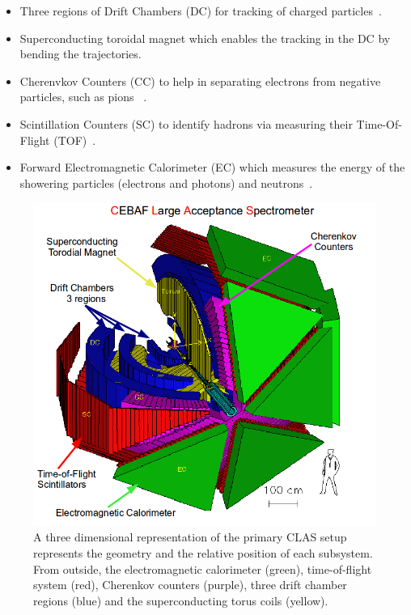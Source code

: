 \documentclass[twocolumn,showpacs,superscriptaddress,groupedaddress]{revtex4}
\begin{document}
\begin{itemize}
 \item Three regions of Drift Chambers (DC) for tracking of charged 
    particles~\cite{DCref}.
 \item Superconducting toroidal magnet which enables the tracking in the DC by 
    bending the trajectories.
 \item Cherenvkov Counters (CC) to help in separating electrons from negative 
    particles, such as pions ~\cite{CCref}.
 \item Scintillation Counters (SC) to identify hadrons via measuring their 
    Time-Of-Flight (TOF)~\cite{TOFref}.
 \item Forward Electromagnetic Calorimeter (EC) which measures the energy of 
    the showering particles (electrons and photons) and neutrons~\cite{ECref}.
\end{itemize}

\begin{figure}[tbp]
\centering \includegraphics[scale=0.3]{fig/test_clas.png}
\caption{A three dimensional representation of the primary CLAS setup 
   represents the geometry and the relative position of each subsystem. From 
   outside, the electromagnetic calorimeter (green), time-of-flight system 
   (red), Cherenkov counters (purple), three drift chamber regions (blue) and 
the superconducting torus coils (yellow).} \label{fig:CLAS}
\end{figure}
\end{document}
